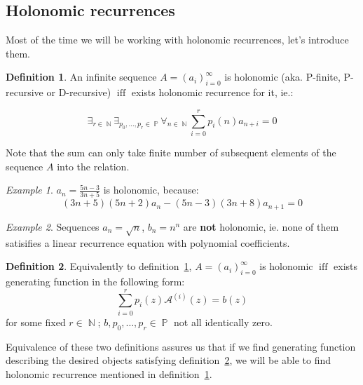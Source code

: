 \documentclass[final]{article}
\theoremstyle{definition}
\newtheorem{definition}{Definition}[subsection]
\theoremstyle{remark}
\newtheorem{example}{Example}[subsection]
\newcommand{\gf}[1]{\ensuremath{\mathcal{#1}}}
\DeclareMathOperator{\textiff}{\text{iff}}
\DeclareMathOperator{\N}{\mathbb{N}}
\DeclareMathOperator{\poly}{\mathbb{P}}
\begin{document}
\subsection{Holonomic recurrences}%
\label{sub:holonomic_recurrences}

Most of the time we will be working with holonomic recurrences, let's introduce them.

\begin{definition}
    \label{def:holo_1}
    \cite{holotoolkit}
    An infinite sequence \(A = (a_i)_{i=0}^{\infty}\) is holonomic (aka. P-finite, P-recursive or D-recursive) \(\textiff\) exists holonomic recurrence for it, ie.:

\[\exists_{r \in \N} \exists_{p_0, \ldots, p_r \in \poly} \forall_{n \in \N} \sum_{i=0}^r p_i(n)a_{n+i} = 0\]
\end{definition}

Note that the sum can only take finite number of subsequent elements of the sequence \(A\) into the relation.

\begin{example}
    \(a_n = \frac{5n - 3}{3n + 5}\) is holonomic, because:
    \[(3n + 5)(5n + 2) a_n - (5n - 3)(3n + 8) a_{n+1} = 0\]
\end{example}

\begin{example}
    Sequences \(a_n = \sqrt{n}\), \(b_n = n^n\) are \textbf{not} holonomic, ie. none of them satisifies a linear recurrence equation with polynomial coefficients\cite{nonholo}.
\end{example}

\begin{definition}
    \label{def:holo_2}
    \cite{complexity}
    Equivalently to definition\ \ref{def:holo_1}, \(A = (a_i)_{i=0}^{\infty}\) is holonomic \(\textiff\) exists generating function in the following form:
    \[\sum_{i=0}^{r} p_i(z) \gf{A}^{(i)}(z) = b(z)\]
    for some fixed \(r \in \N\); \(b, p_0, \ldots, p_r \in \poly\) not all identically zero.
\end{definition}

Equivalence of these two definitions assures us that if we find generating function describing the desired objects satisfying definition\ \ref{def:holo_2}, we will be able to find holonomic recurrence mentioned in definition\ \ref{def:holo_1}.\cite{complexity}
\end{document}
